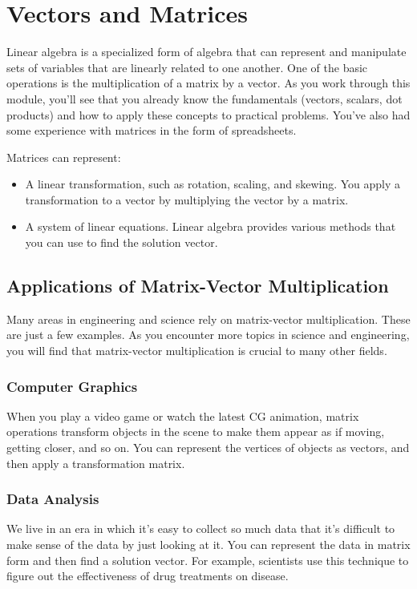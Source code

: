 \chapter{Vectors and Matrices}
Linear algebra is a specialized form of algebra that can represent and manipulate sets of variables that are linearly related to one another. One of the basic operations is the multiplication of a matrix by a vector. As you work through this module, you’ll see that you already know the fundamentals (vectors, scalars, dot products) and how to apply these concepts to practical problems. You’ve also had some experience with matrices in the form of spreadsheets. 

Matrices can represent:
\begin{itemize}
\item A linear transformation, such as rotation, scaling, and skewing. You apply a transformation to a vector by multiplying the vector by a matrix.  
\item A system of linear equations. Linear algebra provides various methods that you can use to find the solution vector. 
\end{itemize}

\section{Applications of Matrix-Vector Multiplication}
Many areas in engineering and science rely on matrix-vector multiplication. These are just a few examples. As you encounter more topics in science and engineering, you will find that matrix-vector multiplication is crucial to many other fields.

\subsection{Computer Graphics}
When you play a video game or watch the latest CG animation, matrix operations transform objects in the scene to make them appear as if moving, getting closer, and so on. You can represent the vertices of objects as vectors, and then apply a transformation matrix.

\subsection{Data Analysis}
We live in an era in which it's easy to collect so much data that it's difficult to make sense of the data by just looking at it. You can represent the data in matrix form and then find a solution vector. For example, scientists use this technique to figure out the effectiveness of drug treatments on disease.

